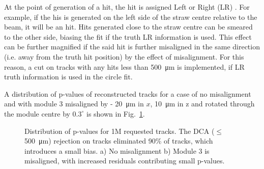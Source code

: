 \documentclass[a4paper,11pt]{article}
\begin{document}
At the point of generation of a hit, the hit is assigned Left or Right (LR) . For example, if the his is generated on the left side of the straw centre relative to the beam, it will be an  hit. Hits generated close to the straw centre can be smeared to the other side, biasing the fit if the truth LR information is used. This effect can be further magnified if the said hit is further misaligned in the same direction (i.e. away from the truth hit position) by the effect of misalignment. For this reason, a cut on tracks with any hits less than \SI{500}{\micro\metre} is implemented, if LR truth information is used in the circle fit. 

A distribution of p-values of reconstructed tracks for a case of no misalignment and with module 3 misaligned by - \SI{20}{\micro\metre} in $x$, \SI{10}{\micro\metre} in z and rotated through the module centre by $0.3^{\circ}$ is shown in Fig.~\ref{fig:pval}.
\vspace{-0.2cm}
\begin{figure}[!ht]
\centering
{}
    \vspace{-0.1cm}
    \caption{Distribution of p-values for 1M requested tracks. The DCA ($\leq$ \SI{500}{\micro\metre}) rejection on tracks eliminated 90\% of tracks, which introduces a small bias. a) No misalignment b) Module 3 is misaligned, with increased residuals contributing small p-values.}
\label{fig:pval} 
\end{figure}
\end{document}
